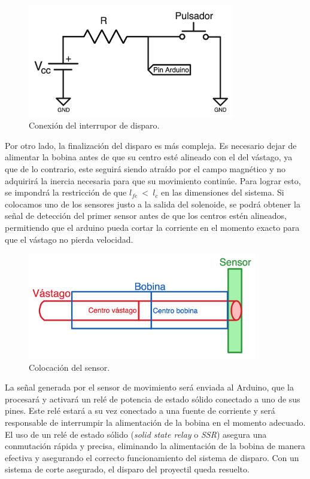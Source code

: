 \begin{figure}[H]
    \centering
    \includegraphics[width=9cm]{FigurasMemoria/conexionInterruptor.png}
    \caption{Conexión del interrupor de disparo.}
    \label{fig:conexionInterruptor} %
\end{figure}

Por otro lado, la finalización del disparo es más compleja. Es necesario dejar de alimentar la bobina antes de que su centro esté alineado con el del vástago, ya que de lo contrario, este seguirá siendo atraído por el campo magnético y no adquirirá la inercia necesaria para que su movimiento continúe. Para lograr esto, se impondrá la restricción de que \(l_{fe}~<~l_c\) en las dimensiones del sistema. Si colocamos uno de los sensores justo a la salida del solenoide, se podrá obtener la señal de detección del primer sensor antes de que los centros estén alineados, permitiendo que el arduino pueda cortar la corriente en el momento exacto para que el vástago no pierda velocidad.

\begin{figure}[H]
    \centering
    \includegraphics[width=10cm]{FigurasMemoria/esquemaJustDisparo.png}
    \caption{Colocación del sensor.}
    \label{fig:esquemaJustDisparo} %
\end{figure}

La señal generada por el sensor de movimiento será enviada al Arduino, que la procesará y activará un relé de potencia de estado sólido conectado a uno de sus pines. Este relé estará a su vez conectado a una fuente de corriente y será responsable de interrumpir la alimentación de la bobina en el momento adecuado. El uso de un relé de estado sólido (\textit{solid state relay} o \textit{SSR}) asegura una conmutación rápida y precisa, eliminando la alimentación de la bobina de manera efectiva y asegurando el correcto funcionamiento del sistema de disparo. Con un sistema de corte asegurado, el disparo del proyectil queda resuelto.

